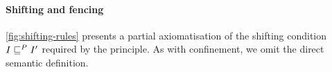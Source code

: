 




\paragraph{Shifting and fencing}
\fig\ref{fig:shifting-rules} presents a partial axiomatisation of the
shifting condition $	I \sqsubseteq^{P} I'	$ required by the \shiftRule
principle.
As
with confinement, we omit the direct semantic definition.
%
%

